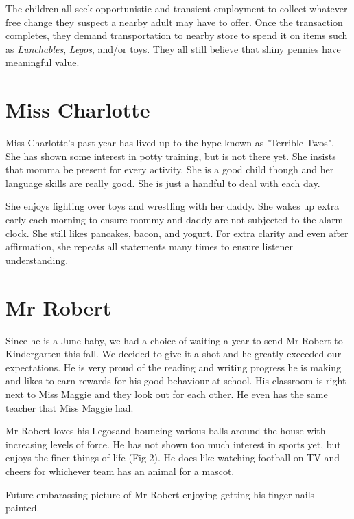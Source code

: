 \documentclass[letterpaper,11pt]{article}
\makeatletter
\newenvironment{figurehere}
  {\def\@captype{figure}}
  {}
\makeatother
\begin{document}
\begin{multicols}{2}
The children all seek opportunistic and transient employment to collect whatever
free change they suspect a nearby adult may have to offer.  Once the transaction
completes, they demand transportation to nearby store to spend it on items such
as \textit{Lunchables}, \textit{Legos\texttrademark}, and/or toys.  They all
still believe that shiny pennies have meaningful value.

\section{Miss Charlotte}

Miss Charlotte's past year has lived up to the hype known as "Terrible Twos". She
has shown some interest in potty training, but is not there yet.  She insists that
momma be present for every activity.  She is a good child though and her language
skills are really good.  She is just a handful to deal with each day.

She enjoys fighting over toys and wrestling with her daddy. She wakes up extra
early each morning to ensure mommy and daddy are not subjected to the alarm clock.
She still likes pancakes, bacon, and yogurt.  For extra clarity and even after
affirmation, she repeats all statements many times to ensure listener understanding.

\section{Mr Robert}

Since he is a June baby, we had a choice of waiting a year to send Mr Robert to
Kindergarten this fall.  We decided to give it a shot and he greatly exceeded
our expectations.  He is very proud of the reading and writing progress he is
making and likes to earn rewards for his good behaviour at school.  His classroom
is right next to Miss Maggie and they look out for each other.  He even has the
same teacher that Miss Maggie had.

Mr Robert loves his Legos\texttrademark and bouncing various balls around the house with 
increasing levels of force.  He has not shown too much interest in sports yet,
but enjoys the finer things of life (Fig 2).  He does like watching football on TV and
cheers for whichever team has an animal for a mascot.

\bigskip

\begin{figurehere}
 \centering   
 \caption{Future embarassing picture of Mr Robert enjoying getting his finger nails painted.}
\end{figurehere}


\end{multicols}
\end{document}
